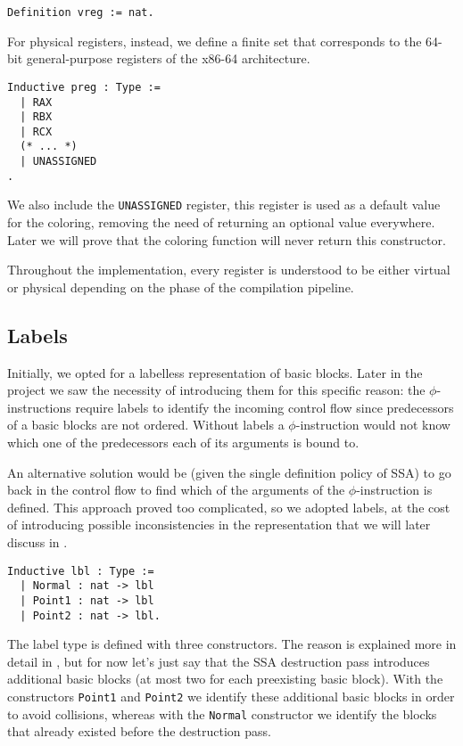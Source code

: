 \begin{lstlisting}[style=Coq]
Definition vreg := nat.
\end{lstlisting}

For physical registers, instead, we define a finite set that corresponds to the 64-bit general-purpose registers of the x86-64 architecture.

\begin{lstlisting}[style=Coq]
Inductive preg : Type :=
  | RAX
  | RBX
  | RCX
  (* ... *)
  | UNASSIGNED
.
\end{lstlisting}

We also include the \texttt{UNASSIGNED} register, this register is used as a default value for the coloring, removing the need of returning an optional value everywhere. Later we will prove that the coloring function will never return this constructor.

Throughout the implementation, every register is understood to be either virtual or physical depending on the phase of the compilation pipeline.

\subsection{Labels}

Initially, we opted for a labelless representation of basic blocks.
Later in the project we saw the necessity of introducing them for this specific reason: the $\phi$-instructions require labels to identify the incoming control flow since predecessors of a basic blocks are not ordered. Without labels a $\phi$-instruction would not know which one of the predecessors each of its arguments is bound to.

An alternative solution would be (given the single definition policy of SSA) to go back in the control flow to find which of the arguments of the $\phi$-instruction is defined. This approach proved too complicated, so we adopted labels, at the cost of introducing possible inconsistencies in the representation that we will later discuss in .

\begin{lstlisting}[style=Coq]
Inductive lbl : Type :=
  | Normal : nat -> lbl
  | Point1 : nat -> lbl
  | Point2 : nat -> lbl.
\end{lstlisting}

The label type is defined with three constructors. The reason is explained more in detail in , but for now let's just say that the SSA destruction pass introduces additional basic blocks (at most two for each preexisting basic block). With the constructors \texttt{Point1} and \texttt{Point2} we identify these additional basic blocks in order to avoid collisions, whereas with the \texttt{Normal} constructor we identify the blocks that already existed before the destruction pass.

